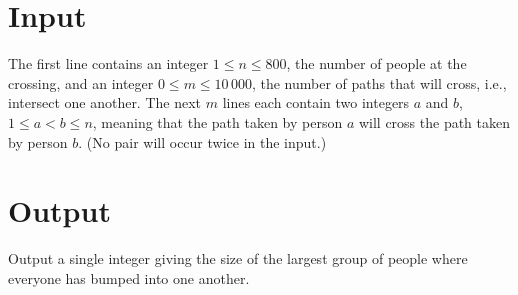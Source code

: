 \section*{Input}
The first line contains an integer $1 \leq n \leq 800$, the number of people at the crossing, and an
integer $0 \leq m \leq 10\,000$, the number of paths that will cross, i.e., intersect one another.
The next $m$ lines each contain two integers $a$ and $b$, $1 \leq a < b \leq n$, meaning that the path taken by person $a$ will cross the path taken by person $b$. (No pair will occur twice in the input.)

\section*{Output}
Output a single integer giving the size of the largest group of people where everyone has bumped into one another.

